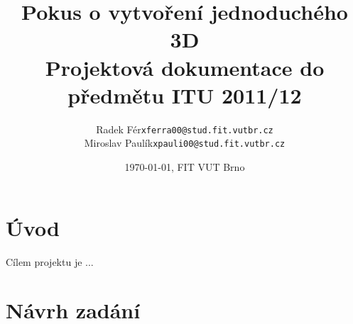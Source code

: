 \documentclass[a4paper,12pt,titlepage]{article}
\begin{document}
\renewcommand{\refname}{Literatura}

\title{\LARGE Pokus o vytvoření jednoduchého 3D  \\
       {\large Projektová dokumentace do předmětu ITU 2011/12}}
\author{ \begin{tabularx}{\textwidth}{ X X}
Radek Fér & \texttt{xferra00@stud.fit.vutbr.cz} \\
Miroslav Paulík & \texttt{xpauli00@stud.fit.vutbr.cz} \\
\end{tabularx}
}
\date{\today, FIT VUT Brno}

\maketitle

\newpage

\thispagestyle{empty}
\tableofcontents
\newpage
\setcounter{page}{1}



\section{Úvod}\label{intro}
Cílem projektu je ...





\newpage

\appendix

\section{Návrh zadání}\label{zadani}
\end{document}
